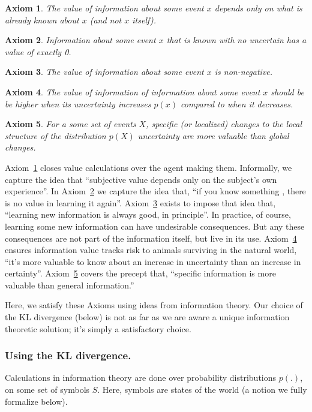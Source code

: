 \documentclass[9pt,twocolumn,twoside]{pnas-new}
\newtheorem{axiom}{Axiom}
\begin{document}
\begin{axiom}
    The value of information about some event $x$ depends \textit{only} on what is already known about $x$ (and not $x$ itself).    
    \label{ax:1}
\end{axiom}
\begin{axiom}
    Information about some event $x$ that is known with no uncertain has a value of exactly 0.
    \label{ax:2}
\end{axiom}
\begin{axiom}
    The value of information about some event $x$ is non-negative. 
    \label{ax:3}
\end{axiom}
\begin{axiom}
    The value of information of information about some event $x$ should be be higher when its uncertainty increases $p(x)$ compared to when it decreases.
    \label{ax:4}
\end{axiom}
\begin{axiom}
    For a some set of events $X$, specific (or localized) changes to the local structure of the distribution $p(X)$ uncertainty are more valuable than global changes.
    \label{ax:5}
\end{axiom}

Axiom~\ref{ax:1} closes value calculations over the agent making them. Informally, we capture the idea that ``subjective value depends only on the subject's own experience''.  In Axiom~\ref{ax:2} we capture the idea that, ``if you know something , there is no value in learning it again''. Axiom~\ref{ax:3} exists to impose that idea that, ``learning new information is always good, in principle''. In practice, of course, learning some new information can have undesirable consequences. But any these consequences are not part of the information itself, but live in its use. Axiom~\ref{ax:4} ensures information value tracks risk to animals surviving in the natural world, ``it's more valuable to know about an increase in uncertainty than an increase in certainty''. Axiom~\ref{ax:5} covers the precept that, ``specific information is more valuable than general information.'' 

Here, we satisfy these Axioms using ideas from information theory. Our choice of the KL divergence (below) is not as far as we are aware a unique information theoretic solution; it's simply a satisfactory choice. 

\subsubsection*{Using the KL divergence.}
Calculations in information theory are done over probability distributions $p(.)$, on some set of symbols $S$. Here, symbols are states of the world (a notion we fully formalize below). 
\end{document}
